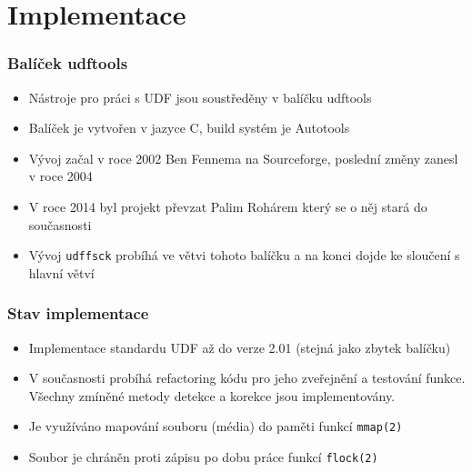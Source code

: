 \documentclass[aspectratio=169]{beamer}
\begin{document}
    \section{Implementace}
		\begin{frame}
			\frametitle{Balíček udftools}
			\vspace{40 pt}
		    \begin{itemize}
                \Large\item Nástroje pro práci s UDF jsou soustředěny v balíčku udftools
                \Large\item Balíček je vytvořen v jazyce C, build systém je Autotools 
                \Large\item Vývoj začal v roce 2002 Ben Fennema na Sourceforge, poslední změny zanesl v roce 2004
                \Large\item V roce 2014 byl projekt převzat Palim Rohárem který se o něj stará do současnosti
                \Large\item Vývoj \texttt{udffsck} probíhá ve větvi tohoto balíčku a na konci dojde ke sloučení s hlavní větví
            \end{itemize}
        \end{frame}
		\begin{frame}
			\frametitle{Stav implementace} %
			\vspace{40 pt}
		    \begin{itemize}
                \Large\item Implementace standardu UDF až do verze 2.01 (stejná jako zbytek balíčku)  
                \Large\item V současnosti probíhá refactoring kódu pro jeho zveřejnění a testování funkce. Všechny zmíněné metody detekce a korekce jsou implementovány.
                \Large\item Je využíváno mapování souboru (média) do paměti funkcí \texttt{mmap(2)}
                \Large\item Soubor je chráněn proti zápisu po dobu práce funkcí \texttt{flock(2)}
            \end{itemize}
		\end{frame}
\end{document}
